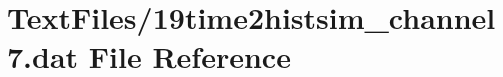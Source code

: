 \hypertarget{19time2histsim__channel7_8dat}{}\section{Text\+Files/19time2histsim\+\_\+channel7.dat File Reference}
\label{19time2histsim__channel7_8dat}
